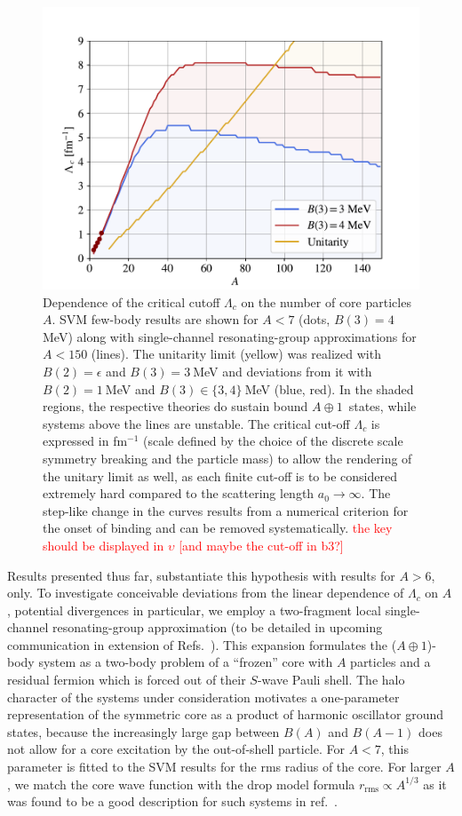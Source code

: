 \documentclass[preprint,12pt]{elsarticle}
\newcommand{\lc}{\ensuremath{\Lambda_c}}
\newcommand{\abb}{\mbox{\ensuremath{A\oplus 1}}}
\newcommand{\red}[1]{\textcolor{red}{#1}}
\begin{document}
\begin{figure}
\centering
\includegraphics[width=\linewidth]{./RGM.pdf} 
\caption{Dependence of the critical cutoff $\lc$ on the number of core particles
$A$. SVM few-body results are shown for $A<7$ (dots, $B(3)=4~$MeV) along with single-channel resonating-group approximations for $A<150$ (lines). The unitarity limit
(yellow) was realized with $B(2)=\epsilon$ and $B(3)=3~$MeV and deviations from it
with $B(2)=1~$MeV and $B(3)\in\lbrace3,4\rbrace~$MeV (blue, red). 
In the shaded regions, the respective theories do sustain bound \abb~states,
while systems above the lines are unstable.
The critical cut-off $\Lambda_c$ is expressed in fm$^{-1}$ (scale defined by the choice of the discrete scale symmetry breaking and the particle mass) to allow the rendering of the unitary limit as well, as each finite cut-off is to be considered extremely hard compared to the scattering length $a_0\rightarrow\infty$.
The step-like change in the curves results from a numerical criterion for the onset of binding and
can be removed systematically. 
\red{the key should be displayed in $\upsilon$ [and maybe the cut-off in b3?]}}
\label{fig:RGM}
\end{figure}


Results presented thus far, substantiate this hypothesis with results for $A>6$, only. To investigate conceivable deviations from
the linear dependence of $\lc$ on $A$, potential divergences in particular, we employ a two-fragment
local single-channel resonating-group approximation
(to be detailed in upcoming communication in extension of Refs.~\cite{PhysRev.52.1083,Naidon_2016}). 
This expansion formulates the (\abb)-body system as a two-body problem of a ``frozen'' core with $A$ particles and a residual
fermion which is forced out of their $S$-wave Pauli shell.
The halo character of the systems under consideration motivates a one-parameter representation of the symmetric core as a product of harmonic oscillator ground states, because the increasingly large gap between $B(A)$ and $B(A-1)$ does not allow for a core excitation
by the out-of-shell particle.
For $A<7$, this parameter is fitted to the SVM results for the rms radius of the core.
For larger $A$, we match the core wave function with the drop model formula $r_\text{rms}\propto A^{1/3}$ as 
it was found to be a good description for such systems in ref.~\cite{manybosons}.
\end{document}

